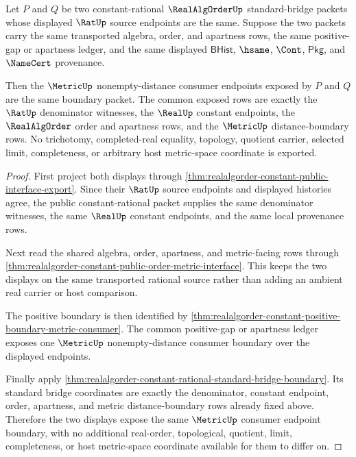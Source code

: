 \begin{theorem}
\label{thm:realalgorder-constant-rational-bridge-endpoint-determinacy}
Let $P$ and $Q$ be two constant-rational $\RealAlgOrderUp$ standard-bridge
packets whose displayed $\RatUp$ source endpoints are the same. Suppose the two
packets carry the same transported algebra, order, and apartness rows, the same
positive-gap or apartness ledger, and the same displayed $\mathsf{BHist}$,
$\hsame$, $\Cont$, $\mathsf{Pkg}$, and $\NameCert$ provenance.

Then the $\MetricUp$ nonempty-distance consumer endpoints exposed by $P$ and
$Q$ are the same boundary packet. The common exposed rows are exactly the
$\RatUp$ denominator witnesses, the $\RealUp$ constant endpoints, the
$\RealAlgOrder$ order and apartness rows, and the $\MetricUp$
distance-boundary rows. No trichotomy, completed-real equality, topology,
quotient carrier, selected limit, completeness, or arbitrary host
metric-space coordinate is exported.
\end{theorem}
\begin{proof}
First project both displays through
\autoref{thm:realalgorder-constant-public-interface-export}. Since their
$\RatUp$ source endpoints and displayed histories agree, the public
constant-rational packet supplies the same denominator witnesses, the same
$\RealUp$ constant endpoints, and the same local provenance rows.

Next read the shared algebra, order, apartness, and metric-facing rows through
\autoref{thm:realalgorder-constant-public-order-metric-interface}. This keeps
the two displays on the same transported rational source rather than adding an
ambient real carrier or host comparison.

The positive boundary is then identified by
\autoref{thm:realalgorder-constant-positive-boundary-metric-consumer}. The
common positive-gap or apartness ledger exposes one $\MetricUp$
nonempty-distance consumer boundary over the displayed endpoints.

Finally apply
\autoref{thm:realalgorder-constant-rational-standard-bridge-boundary}. Its
standard bridge coordinates are exactly the denominator, constant endpoint,
order, apartness, and metric distance-boundary rows already fixed above.
Therefore the two displays expose the same $\MetricUp$ consumer endpoint
boundary, with no additional real-order, topological, quotient, limit,
completeness, or host metric-space coordinate available for them to differ on.
\end{proof}


